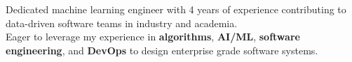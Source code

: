 
\vspace{-0.1cm}
\begin{cvparagraph}

Dedicated machine learning engineer with 4 years of experience contributing to data-driven software teams in industry and academia. \\ Eager to leverage my experience in \textbf{algorithms}, \textbf{AI/ML}, \textbf{software engineering}, and \textbf{DevOps} to design enterprise grade software systems.
\end{cvparagraph}
